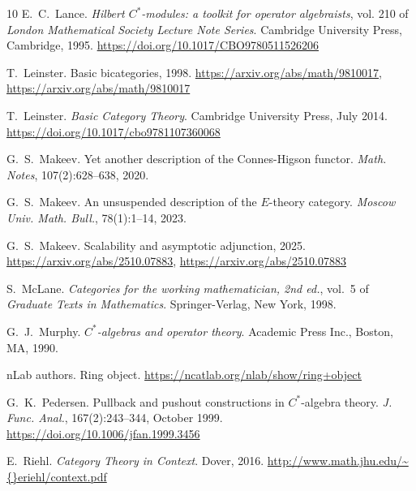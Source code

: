 \documentclass[10pt]{simplearticle}
\begin{document}
\begin{thebibliography}{10}
E.~C.~Lance.
\newblock \emph{Hilbert ${C^*}$-modules: a toolkit for operator algebraists},
  vol. 210 of \emph{London Mathematical Society Lecture Note Series}.
\newblock Cambridge University Press, Cambridge, 1995.
\newblock \url{https://doi.org/10.1017/CBO9780511526206}

T.~Leinster.
\newblock Basic bicategories, 1998.
\newblock \url{https://arxiv.org/abs/math/9810017},
  \url{https://arxiv.org/abs/math/9810017}

T.~Leinster.
\newblock \emph{Basic Category Theory}.
\newblock Cambridge University Press, July 2014.
\newblock \url{https://doi.org/10.1017/cbo9781107360068}

G.~S.~Makeev.
\newblock Yet another description of the {C}onnes-{H}igson functor.
\newblock \emph{Math. Notes}, 107(2):628--638, 2020.

G.~S.~Makeev.
\newblock An unsuspended description of the ${E}$-theory category.
\newblock \emph{Moscow Univ. Math. Bull.}, 78(1):1--14, 2023.

G.~S.~Makeev.
\newblock Scalability and asymptotic adjunction, 2025.
\newblock \url{https://arxiv.org/abs/2510.07883},
  \url{https://arxiv.org/abs/2510.07883}

S.~McLane.
\newblock \emph{Categories for the working mathematician, 2nd ed.}, vol.~5 of
  \emph{Graduate Texts in Mathematics}.
\newblock Springer-Verlag, New York, 1998.

G.~J.~Murphy.
\newblock \emph{{$C^*$}-algebras and operator theory}.
\newblock Academic Press Inc., Boston, MA, 1990.

nLab authors.
\newblock Ring object.
\newblock \url{https://ncatlab.org/nlab/show/ring+object}

G.~K.~Pedersen.
\newblock Pullback and pushout constructions in {$C^*$}-algebra theory.
\newblock \emph{J. Func. Anal.}, 167(2):243–344, October 1999.
\newblock \url{https://doi.org/10.1006/jfan.1999.3456}

E.~Riehl.
\newblock \emph{{Category Theory in Context}}.
\newblock Dover, 2016.
\newblock \url{http://www.math.jhu.edu/\~{}eriehl/context.pdf}

\end{thebibliography}
\end{document}
